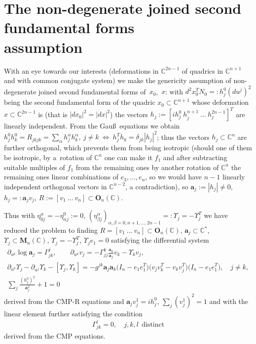\documentclass[pdftex]{sigma}
\begin{document}
\section{The non-degenerate joined second fundamental forms\\ assumption}\label{sec:pet4}

With an eye towards our interests (deformations in
$\mathbb{C}^{2n-1}$ of quadrics in $\mathbb{C}^{n+1}$ and with
common conjugate system) we make the genericity assumption of
non-degenerate joined second fundamental forms of~$x_0$,~$x$: with
$d^2x_0^TN_0=:h_j^0(du^j)^2$ being the second fundamental form of
the quadric $x_0\subset\mathbb{C}^{n+1}$ whose deformation
$x\subset\mathbb{C}^{2n-1}$ is (that is $|dx_0|^2=|dx|^2$) the
vectors $h_j:=[ih_j^0 \ h_j^{n+1} \ \dots \ h_j^{2n-1}]^T$ are
linearly independent. From the Gau\ss\ equations we obtain
$h_j^0h_k^0=R_{jkjk}=\sum_{\alpha}h_j^{\alpha}h_k^{\alpha}, \  j\neq
k \ \Leftrightarrow \ h_j^Th_k=\delta_{jk}|h_j|^2$; thus the vectors
$h_j\subset\mathbb{C}^n$ are further orthogonal, which prevents
them from being isotropic (should one of them be isotropic, by a~rotation of $\mathbb{C}^n$ one can make it $f_1$ and after
subtracting suitable multiples of $f_1$ from the remaining ones by
another rotation of $\mathbb{C}^n$ the remaining ones linear
combinations of $e_3,\dots ,e_n$, so we would have $n-1$ linearly
independent orthogonal vectors in $\mathbb{C}^{n-2}$, a
contradiction), so $\mathbf{a}_j:=|h_j|\neq 0$,
$h_j=:\mathbf{a}_jv_j$, $R:=[v_1\ \dots \
v_n]\subset\mathbf{O}_n(\mathbb{C})$.

Thus with $\eta_{0j}^{\alpha}=-\eta_{\alpha j}^0:=0$, $(\eta_{\beta
j}^{\alpha})_{\alpha,\beta=0,n+1,\dots ,2n-1}=:\Upsilon_j=-\Upsilon_j^T$
we have reduced the problem to f\/inding $R=[v_1\ \dots \
v_n]\subset\mathbf{O}_n(\mathbb{C})$,
$\mathbf{a}_j\subset\mathbb{C}^*$,
$\Upsilon_j\subset\mathbf{M}_n(\mathbb{C})$,
$\Upsilon_j=-\Upsilon_j^T$, $\Upsilon_je_1=0$ satisfying the
dif\/ferential system
\begin{gather}
\partial_{u^k}\log\mathbf{a}_j=\Gamma_{jk}^j,\qquad
\partial_{u^k}v_j=-\Gamma_{jj}^k\frac{\mathbf{a}_k}{\mathbf{a}_j}v_k-\Upsilon_kv_j,\nonumber\\
\partial_{u^k}\Upsilon_j-\partial_{u^j}\Upsilon_k-[\Upsilon_j,\Upsilon_k]
=-g^{jk}\mathbf{a}_j\mathbf{a}_k\big(I_n-e_1e_1^T\big)\big(v_jv_k^T-v_kv_j^T\big)\big(I_n-e_1e_1^T\big),\quad
j\neq k,\nonumber\\
\sum_j\frac{(h_j^0)^2}{\mathbf{a}_j^2}+1=0\label{eq:syst}
\end{gather} derived from the CMP-R
equations and $\mathbf{a}_jv_j^1=ih_j^0$, $\sum_j(v_j^1)^2=1$ and
with the linear element further satisfying the condition
\begin{gather}
\Gamma_{jk}^l=0,\quad  j,k,l\ \ \mathrm{distinct}\label{eq:jkl}
\end{gather}
derived from the CMP equations.
\end{document}
